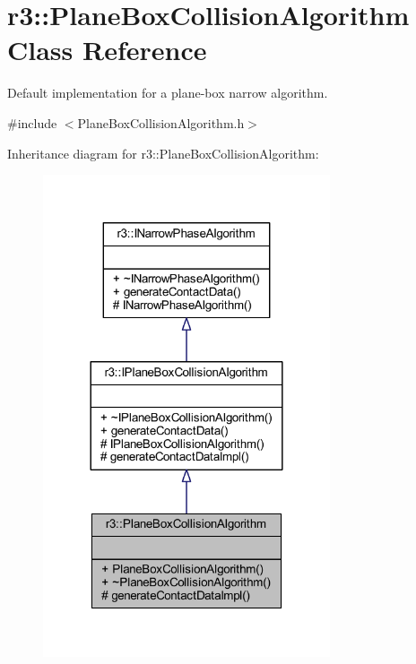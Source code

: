 \hypertarget{classr3_1_1_plane_box_collision_algorithm}{}\section{r3\+:\+:Plane\+Box\+Collision\+Algorithm Class Reference}
\label{classr3_1_1_plane_box_collision_algorithm}


Default implementation for a plane-\/box narrow algorithm.  




{\ttfamily \#include $<$Plane\+Box\+Collision\+Algorithm.\+h$>$}



Inheritance diagram for r3\+:\+:Plane\+Box\+Collision\+Algorithm\+:\nopagebreak
\begin{figure}[H]
\begin{center}
\leavevmode
\includegraphics[width=240pt]{classr3_1_1_plane_box_collision_algorithm__inherit__graph}
\end{center}
\end{figure}


